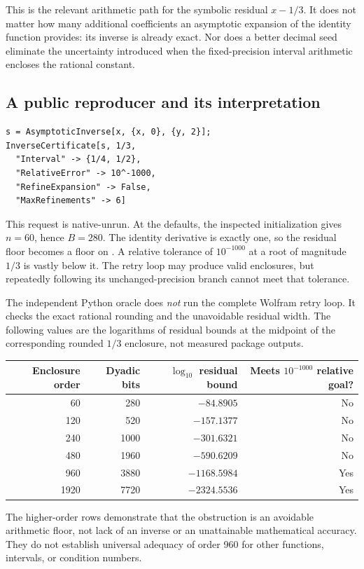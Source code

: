 \documentclass[11pt,a4paper]{article}
\newcommand{\code}[1]{\texttt{\detokenize{#1}}}
\begin{document}
This is the relevant arithmetic path for the symbolic residual \(x-1/3\). It does not matter how many additional coefficients an asymptotic expansion of the identity function provides: its inverse is already exact. Nor does a better decimal seed eliminate the uncertainty introduced when the fixed-precision interval arithmetic encloses the rational constant.

\subsection{A public reproducer and its interpretation}
\begin{lstlisting}
s = AsymptoticInverse[x, {x, 0}, {y, 2}];
InverseCertificate[s, 1/3,
  "Interval" -> {1/4, 1/2},
  "RelativeError" -> 10^-1000,
  "RefineExpansion" -> False,
  "MaxRefinements" -> 6]
\end{lstlisting}
This request is native-unrun. At the defaults, the inspected initialization gives \(n=60\), hence \(B=280\). The identity derivative is exactly one, so the residual floor becomes a floor on \code{CertifiedErrorBound}. A relative tolerance of \(10^{-1000}\) at a root of magnitude \(1/3\) is vastly below it. The retry loop may produce valid enclosures, but repeatedly following its unchanged-precision branch cannot meet that tolerance.

The independent Python oracle does \emph{not} run the complete Wolfram retry loop. It checks the exact rational rounding and the unavoidable residual width. The following values are the logarithms of residual bounds at the midpoint of the corresponding rounded \(1/3\) enclosure, not measured package outputs.
\begin{center}\small
\begin{tabular}{@{}rrrr@{}}
\toprule Enclosure order & Dyadic bits & $\log_{10}$ residual bound & Meets $10^{-1000}$ relative goal?\\\midrule
60 & 280 & $-84.8905$ & No\\
120 & 520 & $-157.1377$ & No\\
240 & 1000 & $-301.6321$ & No\\
480 & 1960 & $-590.6209$ & No\\
960 & 3880 & $-1168.5984$ & Yes\\
1920 & 7720 & $-2324.5536$ & Yes\\\bottomrule
\end{tabular}
\end{center}

The higher-order rows demonstrate that the obstruction is an avoidable arithmetic floor, not lack of an inverse or an unattainable mathematical accuracy. They do not establish universal adequacy of order 960 for other functions, intervals, or condition numbers.
\end{document}
